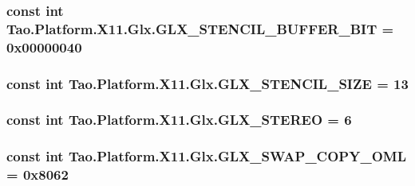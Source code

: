 \label{class_tao_1_1_platform_1_1_x11_1_1_glx_aba49bcbbff3a03176c368da11db5aaae}
\hypertarget{class_tao_1_1_platform_1_1_x11_1_1_glx_abe1d839f1268a0a69d7754360a86a539}{
\subsubsection[{GLX\_\-STENCIL\_\-BUFFER\_\-BIT}]{\setlength{\rightskip}{0pt plus 5cm}const int {\bf Tao.Platform.X11.Glx.GLX\_\-STENCIL\_\-BUFFER\_\-BIT} = 0x00000040}}
\label{class_tao_1_1_platform_1_1_x11_1_1_glx_abe1d839f1268a0a69d7754360a86a539}
\hypertarget{class_tao_1_1_platform_1_1_x11_1_1_glx_a64b2809c8935d9a5e6cd2fd81ae7273a}{
\subsubsection[{GLX\_\-STENCIL\_\-SIZE}]{\setlength{\rightskip}{0pt plus 5cm}const int {\bf Tao.Platform.X11.Glx.GLX\_\-STENCIL\_\-SIZE} = 13}}
\label{class_tao_1_1_platform_1_1_x11_1_1_glx_a64b2809c8935d9a5e6cd2fd81ae7273a}
\hypertarget{class_tao_1_1_platform_1_1_x11_1_1_glx_a15dffacce94171d23e8941ce8c7128b1}{
\subsubsection[{GLX\_\-STEREO}]{\setlength{\rightskip}{0pt plus 5cm}const int {\bf Tao.Platform.X11.Glx.GLX\_\-STEREO} = 6}}
\label{class_tao_1_1_platform_1_1_x11_1_1_glx_a15dffacce94171d23e8941ce8c7128b1}
\hypertarget{class_tao_1_1_platform_1_1_x11_1_1_glx_a70d4f7954350861ad0d71ed03e300b33}{
\subsubsection[{GLX\_\-SWAP\_\-COPY\_\-OML}]{\setlength{\rightskip}{0pt plus 5cm}const int {\bf Tao.Platform.X11.Glx.GLX\_\-SWAP\_\-COPY\_\-OML} = 0x8062}}
